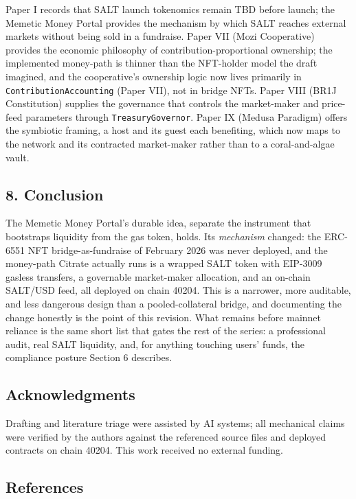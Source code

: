 Paper I records that SALT launch tokenomics remain TBD before launch; the Memetic Money Portal provides the mechanism by which SALT
reaches external markets without being sold in a fundraise. Paper VII
(Mozi Cooperative) provides the economic philosophy of
contribution-proportional ownership; the implemented money-path is
thinner than the NFT-holder model the draft imagined, and the
cooperative's ownership logic now lives primarily in
\texttt{ContributionAccounting} (Paper VII), not in bridge NFTs. Paper
VIII (BR1J Constitution) supplies the governance that controls the
market-maker and price-feed parameters through
\texttt{TreasuryGovernor}. Paper IX (Medusa Paradigm) offers the
symbiotic framing, a host and its guest each benefiting, which now maps
to the network and its contracted market-maker rather than to a
coral-and-algae vault.

\subsection{8. Conclusion}\label{conclusion}

The Memetic Money Portal's durable idea, separate the instrument that
bootstraps liquidity from the gas token, holds. Its \emph{mechanism}
changed: the ERC-6551 NFT bridge-as-fundraise of February 2026 was never
deployed, and the money-path Citrate actually runs is a wrapped SALT
token with EIP-3009 gasless transfers, a governable market-maker
allocation, and an on-chain SALT/USD feed, all deployed on chain 40204.
This is a narrower, more auditable, and less dangerous design than a
pooled-collateral bridge, and documenting the change honestly is the
point of this revision. What remains before mainnet reliance is the same
short list that gates the rest of the series: a professional audit, real
SALT liquidity, and, for anything touching users' funds, the compliance
posture Section 6 describes.

\subsection{Acknowledgments}\label{acknowledgments}

Drafting and literature triage were assisted by AI systems; all
mechanical claims were verified by the authors against the referenced
source files and deployed contracts on chain 40204. This work received
no external funding.

\subsection{References}\label{references}

